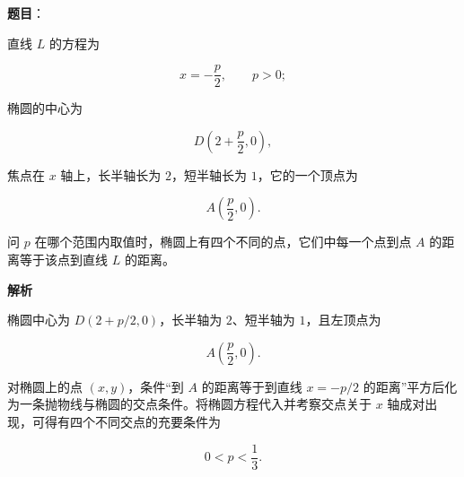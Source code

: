\begin{answer}

\textbf{题目}：

直线 $L$ 的方程为

\nopagebreak[4]
\[
x=-\frac p2,\qquad p>0;
\]

椭圆的中心为

\nopagebreak[4]
\[
D\left(2+\frac p2,0\right),
\]

焦点在 $x$ 轴上，长半轴长为 $2$，短半轴长为 $1$，它的一个顶点为

\nopagebreak[4]
\[
A\left(\frac p2,0\right).
\]

问 $p$ 在哪个范围内取值时，椭圆上有四个不同的点，它们中每一个点到点 $A$ 的距离等于该点到直线 $L$ 的距离。

\textbf{解析}

椭圆中心为 $D(2+p/2,0)$，长半轴为 $2$、短半轴为 $1$，且左顶点为

\nopagebreak[4]
\[
A\left(\frac p2,0\right).
\]

对椭圆上的点 $(x,y)$，条件“到 $A$ 的距离等于到直线 $x=-p/2$ 的距离”平方后化为一条抛物线与椭圆的交点条件。将椭圆方程代入并考察交点关于 $x$ 轴成对出现，可得有四个不同交点的充要条件为

\nopagebreak[4]
\[
0<p<\frac13.
\]


\end{answer}